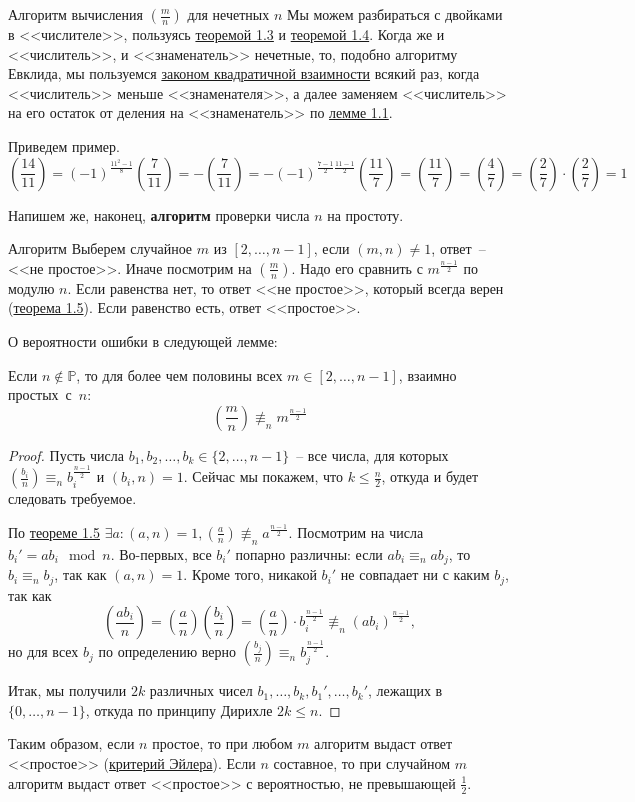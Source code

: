 \begin{algodescription}{Алгоритм вычисления $\left(\frac{m}{n}\right)$ для нечетных $n$}
Мы можем разбираться с двойками в <<числителе>>, пользуясь \hyperlink{multiplicative}{теоремой 1.3} и \hyperlink{twojacobi}{теоремой 1.4}. Когда же и <<числитель>>, и <<знаменатель>> нечетные, то, подобно алгоритму Евклида, мы пользуемся \hyperlink{qreciproc}{законом квадратичной взаимности} всякий раз, когда <<числитель>> меньше <<знаменателя>>, а далее заменяем <<числитель>>  на его остаток от деления на <<знаменатель>> по \hyperlink{aequivb}{лемме 1.1}.
\end{algodescription}

Приведем пример.
$$\left(\frac{14}{11}\right) = (-1)^\frac{11^2-1}{8}\left(\frac{7}{11}\right) = - \left(\frac{7}{11}\right) = -(-1)^{\frac{7-1}{2}\frac{11-1}{2}}\left(\frac{11}{7}\right) = \left(\frac{11}{7}\right) = \left(\frac{4}{7}\right) = \left(\frac{2}{7}\right)\cdot\left(\frac{2}{7}\right) = 1$$

Напишем же, наконец, \textbf{алгоритм} проверки числа $n$ на простоту.

\begin{algodescription}{Алгоритм}
    Выберем случайное $m$ из $[2,\ldots,n-1]$, если $(m,n)\ne 1$, ответ~-- <<не простое>>. Иначе посмотрим на $\left(\frac{m}{n}\right)$. Надо его сравнить с $m^{\frac{n-1}{2}}$ по модулю $n$. Если равенства нет, то ответ <<не простое>>, который всегда верен (\hyperlink{solovaytest}{теорема 1.5}). Если равенство есть, ответ <<простое>>.
\end{algodescription}

О вероятности ошибки в следующей лемме:
\begin{lemma} Если $n\not\in\mathbb{P}$, то для более чем половины всех $m \in [2, \ldots, n-1]$, взаимно простых~с~$n$: $$\left(\frac{m}{n}\right)\not\equiv_n m^{\frac{n-1}{2}}$$
\end{lemma}
\begin{proof}
Пусть числа $b_1, b_2, \ldots, b_k \in \{2, \ldots, n-1\}$~-- все числа, для которых $\left(\frac{b_i}{n}\right)\equiv_n b_i^\frac{n-1}{2}$ и $(b_i,n)=1$. Сейчас мы покажем, что $k \leq \frac{n}{2}$, откуда и будет следовать требуемое.

По \hyperlink{solovaytest}{теореме 1.5} $\exists a: (a,n)=1, (\frac{a}{n})\not\equiv_n a^\frac{n-1}{2}$. Посмотрим на  числа $b_i' = ab_i \mod {n}$. Во-первых, все $b_i'$ попарно различны: если $ab_i \equiv_n ab_j$, то $b_i \equiv_n b_j$, так как $(a,n)=1$. Кроме того, никакой $b_i'$ не совпадает ни с каким $b_j$, так как
$$\left(\frac{ab_i}{n}\right)=\left(\frac{a}{n}\right)\left(\frac{b_i}{n}\right)=\left(\frac{a}{n}\right)\cdot b_i^\frac{n-1}{2}\not\equiv_n (ab_i)^\frac{n-1}{2},$$
но для всех $b_j$ по определению верно $\left(\frac{b_j}{n}\right) \equiv_n b_j^\frac{n-1}{2}$.

Итак, мы получили $2k$ различных чисел $b_1, \ldots, b_k, b_1', \ldots, b_k'$, лежащих в $\{0, \ldots, n-1\}$, откуда по принципу Дирихле $2k \leq n$.
\end{proof}

Таким образом, если $n$ простое, то при любом $m$ алгоритм выдаст ответ <<простое>> (\hyperlink{euler}{критерий Эйлера}). Если $n$ составное, то при случайном $m$ алгоритм выдаст ответ <<простое>> с вероятностью, не превышающей $\frac{1}{2}$.
